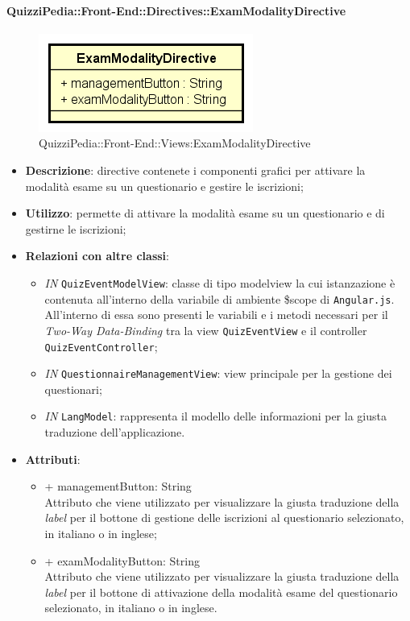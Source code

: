 \paragraph{QuizziPedia::Front-End::Directives::ExamModalityDirective}
\begin{figure} [ht]
	\centering
	\includegraphics[scale=0.45]{UML/Classi/Front-End/QuizziPedia_Front-end_ExamModalityDirective.png}
	\caption{QuizziPedia::Front-End::Views:ExamModalityDirective}
\end{figure} \FloatBarrier
\begin{itemize}
	\item \textbf{Descrizione}: directive contenete i componenti grafici per attivare la modalità esame su un questionario e gestire le iscrizioni;
	\item \textbf{Utilizzo}: permette di attivare la modalità esame su un questionario e di gestirne le iscrizioni;
	\item \textbf{Relazioni con altre classi}:
	\begin{itemize}
		\item \textit{IN} \texttt{QuizEventModelView}: classe di tipo modelview la cui istanzazione è contenuta all'interno della variabile di ambiente \$scope di \texttt{Angular.js}. All'interno di essa sono presenti le variabili e i metodi necessari per il \textit{Two-Way Data-Binding} tra la view \texttt{QuizEventView} e il controller \texttt{QuizEventController};
		\item \textit{IN} \texttt{QuestionnaireManagementView}: view principale per la gestione dei questionari; 
		\item \textit{IN} \texttt{LangModel}: rappresenta il modello delle informazioni per la giusta traduzione dell'applicazione.
	\end{itemize}
		\item \textbf{Attributi}:
		\begin{itemize}
			\item {+ managementButton: String} \\ Attributo che viene utilizzato per visualizzare la giusta traduzione della \textit{label} per il bottone di gestione delle iscrizioni al questionario selezionato, in italiano o in inglese; 
			\item {+ examModalityButton: String} \\ Attributo che viene utilizzato per visualizzare la giusta traduzione della \textit{label} per il bottone di attivazione della modalità esame del questionario selezionato, in italiano o in inglese.
		\end{itemize}
\end{itemize}

